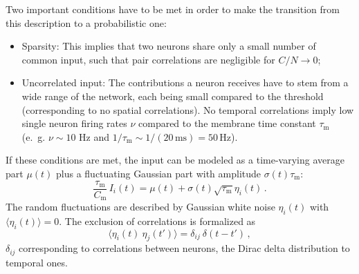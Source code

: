 Two important conditions have to be met in order to make the transition from 
this description to a probabilistic one:
\begin{itemize}
    \item Sparsity: This implies that 
        two neurons share only a small number of common input, such that pair correlations
        are negligible for $C / N \to 0$; 
    \item Uncorrelated input: The contributions a neuron receives have to stem from 
        a wide range of the network, each being small compared to the threshold
        (corresponding to no spatial correlations). 
        No temporal correlations imply low single neuron firing rates $\nu$ compared 
        to the membrane time constant $\tau_\text{m}$
        (e.~g. $\nu \sim10$ Hz and $1 / \tau_\text{m} \sim 1 / (20\,\text{ms}) = 50\, \text{Hz}$).
\end{itemize}
If these conditions are met, the input can be modeled as a time-varying average part
$\mu(t)$ plus a fluctuating Gaussian part with amplitude $\sigma(t)\tau_\text{m}$:
\begin{equation}
    \frac{\tau_\text{m}}{C_\text{m}} \, I_i(t) =  \mu(t) + \sigma(t) \sqrt{\tau_\text{m}} \eta_i(t) \, .
    \label{eq:input_random}
\end{equation}
The random fluctuations are described by Gaussian white noise $\eta_i(t)$ with 
$\langle  \eta_i(t)\rangle = 0$. 
The exclusion of correlations is formalized as  
\begin{equation}
    \langle \eta_i(t) \: \eta_j(t') \rangle = \delta_{ij} \: \delta(t - t')	\, ,
    \label{eq:no_correlations}
\end{equation}
$\delta_{ij}$ corresponding to correlations between neurons, 
the Dirac delta distribution to temporal ones. 

